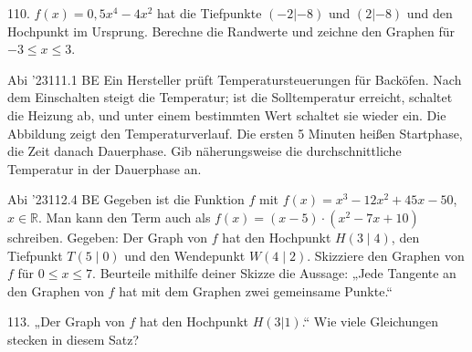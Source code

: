 \documentclass[11pt]{article}
\begin{document}
\pfgruppe{}
\begin{pfaufg}{}{110.}{}
$f(x) = 0{,}5x^4 - 4x^2$ hat die Tiefpunkte $(-2 | -8)$ und $(2 | -8)$ und den Hochpunkt im Ursprung. Berechne die Randwerte und zeichne den Graphen für $-3 \le x \le 3$.
\par\smallskip\noindent \begin{ksys}[xmin=-4,xmax=4,ymin=-9,ymax=5]\end{ksys}\par
{}
\end{pfaufg}
\pfgruppe{}
\begin{pfaufg}{Abi ’23}{111.}{1 BE}
Ein Hersteller prüft Temperatursteuerungen für Backöfen. Nach dem Einschalten steigt die Temperatur; ist die Solltemperatur erreicht, schaltet die Heizung ab, und unter einem bestimmten Wert schaltet sie wieder ein. Die Abbildung zeigt den Temperaturverlauf. Die ersten 5 Minuten heißen Startphase, die Zeit danach Dauerphase. Gib näherungsweise die durchschnittliche Temperatur in der Dauerphase an.
\par\smallskip\noindent {}\par
{}
\end{pfaufg}
\pfgruppe{}
\begin{pfaufg}{Abi ’23}{112.}{4 BE}
Gegeben ist die Funktion $f$ mit $f(x) = x^3 - 12x^2 + 45x - 50$, $x \in \mathbb{R}$. Man kann den Term auch als $f(x) = (x - 5)\cdot(x^2 - 7x + 10)$ schreiben. Gegeben: Der Graph von $f$ hat den Hochpunkt $H(3 \mid 4)$, den Tiefpunkt $T(5 \mid 0)$ und den Wendepunkt $W(4 \mid 2)$. Skizziere den Graphen von $f$ für $0 \le x \le 7$. Beurteile mithilfe deiner Skizze die Aussage: „Jede Tangente an den Graphen von $f$ hat mit dem Graphen zwei gemeinsame Punkte.“
\end{pfaufg}
\begin{pfaufg}{}{113.}{}
„Der Graph von $f$ hat den Hochpunkt $H(3|1)$.“ Wie viele Gleichungen stecken in diesem Satz? 
\end{pfaufg}
\end{document}
